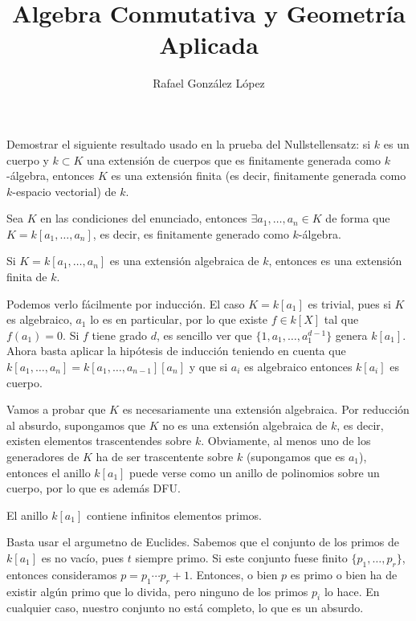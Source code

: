 \documentclass[twoside]{article}
\begin{document}
\title{Algebra Conmutativa y Geometría Aplicada}
\author{Rafael González López}
\maketitle

\begin{ejercicio}{2} Demostrar el siguiente resultado usado en la prueba del Nullstellensatz: si $k$ es un cuerpo y $k \subset K$ una extensión de cuerpos que es finitamente generada como $k$-álgebra, entonces $K$ es una extensión finita (es decir, finitamente generada como $k$-espacio vectorial) de $k$.
\begin{solucion}
Sea $K$ en las condiciones del enunciado, entonces $\exists a_1,\dotsc,a_n \in K$ de forma que $K=k[a_1,\dotsc,a_n]$, es decir, es finitamente generado como $k$-álgebra. 
\begin{lema} Si $K=k[a_1,\dotsc,a_n]$ es una extensión algebraica de $k$, entonces es una extensión finita de $k$.
\end{lema}
\begin{dem}
Podemos verlo fácilmente por inducción. El caso $K=k[a_1]$ es trivial, pues si $K$ es algebraico, $a_1$ lo es en particular, por lo que existe $f\in k[X]$ tal que $f(a_1)=0$. Si $f$ tiene grado $d$, es sencillo ver que $\{1,a_1,\dotsc,a_1^{d-1}\}$ genera $k[a_1]$. Ahora basta aplicar la hipótesis de inducción teniendo en cuenta que $k[a_1,\dotsc,a_n]=k[a_1,\dotsc,a_{n-1}][a_n]$ y que si $a_i$ es algebraico entonces $k[a_i]$ es cuerpo.
\end{dem}

Vamos a probar que $K$ es necesariamente una extensión algebraica. Por reducción al absurdo, supongamos que $K$ no es una extensión algebraica de $k$, es decir, existen elementos trascentendes sobre $k$. Obviamente, al menos uno de los generadores de $K$ ha de ser trascentente sobre $k$ (supongamos que es $a_1$), entonces el anillo $k[a_1]$ puede verse como un anillo de polinomios sobre un cuerpo, por lo que es además DFU.

\begin{lema}El anillo $k[a_1]$ contiene infinitos elementos primos.
\end{lema}
\begin{dem}
Basta usar el argumetno de Euclides. Sabemos que el conjunto de los primos de $k[a_1]$ es no vacío, pues $t$ siempre primo. Si este conjunto fuese finito $\{p_1,\dotsc,p_r\}$, entonces consideramos $p=p_1\cdots p_r +1$. Entonces, o bien $p$ es primo o bien ha de existir algún primo que lo divida, pero ninguno de los primos $p_i$ lo hace. En cualquier caso, nuestro conjunto no está completo, lo que es un absurdo.


\end{dem}
\end{solucion}
\end{ejercicio}
\end{document}
